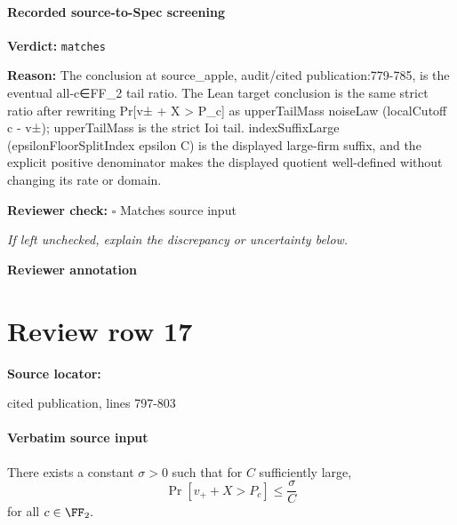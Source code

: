 \documentclass[10pt]{article}
\newcommand{\reviewerbox}{%
  \par\noindent\fbox{\parbox{0.96\linewidth}{\rule{0pt}{0.38in}}}\par
}
\newcommand{\reviewmatch}[1]{%
  \par\noindent\textbf{Reviewer check:} $\square$\; #1\par
  \noindent\emph{If left unchecked, explain the discrepancy or uncertainty below.}\par
}
\begin{document}
\paragraph{Recorded source-to-Spec screening}
\textbf{Verdict:} \texttt{matches}
\\
{\raggedright
\textbf{Reason:} The conclusion at source\_\allowbreak{}apple, audit/\allowbreak{}cited publication:\allowbreak{}779-\allowbreak{}785, is the eventual all-\allowbreak{}c∈FF\_\allowbreak{}2 tail ratio.\allowbreak{} The Lean target conclusion is the same strict ratio after rewriting Pr[v± + X > P\_\allowbreak{}c] as upperTailMass noiseLaw (localCutoff c -\allowbreak{} v±);\allowbreak{} upperTailMass is the strict Ioi tail.\allowbreak{} indexSuffixLarge (epsilonFloorSplitIndex epsilon C) is the displayed large-\allowbreak{}firm suffix, and the explicit positive denominator makes the displayed quotient well-\allowbreak{}defined without changing its rate or domain.\allowbreak{}
\par}
\reviewmatch{Matches source input}
\noindent\textbf{Reviewer annotation}\par
\reviewerbox
\clearpage
\hypertarget{source-claim-c2e5b332ed480ff8}{}
\section*{Review row 17}
\textbf{Source locator:} {\footnotesize\raggedright cited publication, lines 797-\allowbreak{}803\par}
\paragraph{Verbatim source input}
\begin{ReviewVerbatim}
\begin{lemma}
    There exists a constant $\sigma>0$ such that for $C$ sufficiently large,
    \begin{equation}
        \Pr[v_+ + X > P_c] \le \frac{\sigma}{C}
    \end{equation}
    for all $c\in \FF_2.$
\end{lemma}
\end{ReviewVerbatim}
\end{document}
